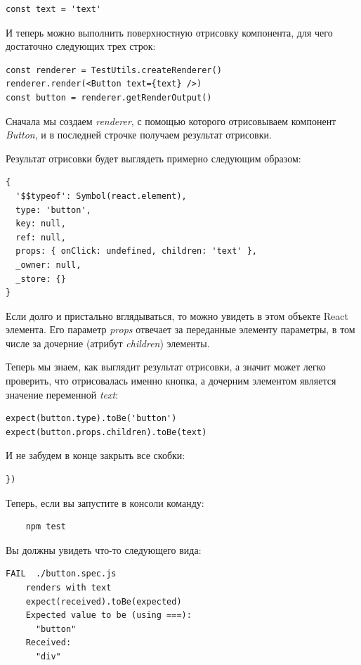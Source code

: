 \begin{lstlisting}
const text = 'text'
\end{lstlisting}

И теперь можно выполнить поверхностную отрисовку компонента, для чего достаточно следующих трех строк:

\begin{lstlisting}
const renderer = TestUtils.createRenderer()
renderer.render(<Button text={text} />)
const button = renderer.getRenderOutput()
\end{lstlisting}

Сначала мы создаем \textit{renderer}, с помощью которого отрисовываем компонент \textit{Button}, и в последней строчке получаем результат отрисовки.

Результат отрисовки будет выглядеть примерно следующим образом:

\begin{lstlisting}
{
  '$$typeof': Symbol(react.element),
  type: 'button',
  key: null,
  ref: null,
  props: { onClick: undefined, children: 'text' },
  _owner: null,
  _store: {}
}
\end{lstlisting}

Если долго и пристально вглядываться, то можно увидеть в этом объекте React элемента. Его параметр \textit{props} отвечает за переданные элементу параметры, в том числе за дочерние (атрибут \textit{children}) элементы.

Теперь мы знаем, как выглядит результат отрисовки, а значит может легко проверить, что отрисовалась именно кнопка, а дочерним элементом является значение переменной \textit{text}:

\begin{lstlisting}
expect(button.type).toBe('button')
expect(button.props.children).toBe(text)
\end{lstlisting}

И не забудем в конце закрыть все скобки:

\begin{lstlisting}
})
\end{lstlisting}

Теперь, если вы запустите в консоли команду:

\begin{lstlisting}
	npm test
\end{lstlisting}

Вы должны увидеть что-то следующего вида:

\begin{lstlisting}
FAIL  ./button.spec.js
    renders with text
    expect(received).toBe(expected)
    Expected value to be (using ===):
      "button"
    Received:
      "div"
\end{lstlisting}

